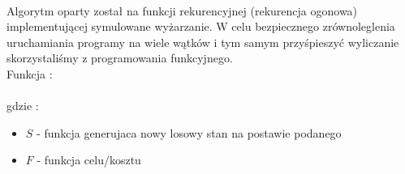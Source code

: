 \documentclass[wide,a4paper,titlepage,12pt] {article}
\begin{document}
\paragraph{}
Algorytm oparty został na funkcji rekurencyjnej (rekurencja ogonowa) implementującej symulowane wyżarzanie. W celu bezpiecznego zrównoleglenia uruchamiania programy na wiele wątków i tym samym przyśpieszyć wyliczanie skorzystaliśmy z programowania funkcyjnego.
\\ Funkcja : \\
\lstset{ %
    language=java,                %
    basicstyle=\scriptsize,       %
    numbers=left,                   %
    numberstyle=\scriptsize,      %
    stepnumber=10,                   %
    numbersep=9pt,                  %
    showspaces=false,               %
    showstringspaces=false,         %
    showtabs=false,                 %
    breaklines=true,                %
    }
    
\paragraph{}
gdzie :
\begin{itemize}
  \item $S$ - funkcja generujaca nowy losowy stan na postawie podanego
  \item $F$ - funkcja celu/kosztu
\end{itemize}
\newpage
\end{document}
